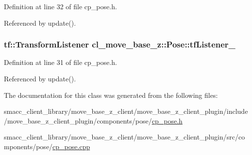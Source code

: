Definition at line 32 of file cp\+\_\+pose.\+h.



Referenced by update().

\subsubsection[{\texorpdfstring{tf\+Listener\+\_\+}{tfListener_}}]{\setlength{\rightskip}{0pt plus 5cm}tf\+::\+Transform\+Listener cl\+\_\+move\+\_\+base\+\_\+z\+::\+Pose\+::tf\+Listener\+\_\+\hspace{0.3cm}{\ttfamily [private]}}\hypertarget{classcl__move__base__z_1_1Pose_a6d669632db37e0e51734d2a65e8dcd41}{}\label{classcl__move__base__z_1_1Pose_a6d669632db37e0e51734d2a65e8dcd41}


Definition at line 31 of file cp\+\_\+pose.\+h.



Referenced by update().



The documentation for this class was generated from the following files\+:\begin{DoxyCompactItemize}
\item 
smacc\+\_\+client\+\_\+library/move\+\_\+base\+\_\+z\+\_\+client/move\+\_\+base\+\_\+z\+\_\+client\+\_\+plugin/include/move\+\_\+base\+\_\+z\+\_\+client\+\_\+plugin/components/pose/\hyperlink{cp__pose_8h}{cp\+\_\+pose.\+h}\item 
smacc\+\_\+client\+\_\+library/move\+\_\+base\+\_\+z\+\_\+client/move\+\_\+base\+\_\+z\+\_\+client\+\_\+plugin/src/components/pose/\hyperlink{cp__pose_8cpp}{cp\+\_\+pose.\+cpp}\end{DoxyCompactItemize}
